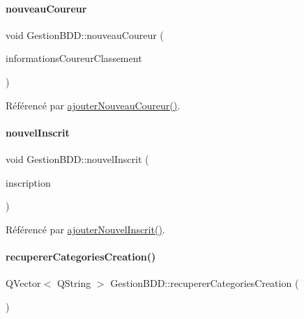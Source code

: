 \mbox{\label{class_gestion_b_d_d_acf915265e83f03b500f10ffbde2680bb}} 
\paragraph{\texorpdfstring{nouveau\+Coureur}{nouveauCoureur}}
{\footnotesize\ttfamily void Gestion\+B\+D\+D\+::nouveau\+Coureur (\begin{DoxyParamCaption}\item[{Q\+String\+List}]{informations\+Coureur\+Classement }\end{DoxyParamCaption})\hspace{0.3cm}{\ttfamily [signal]}}



Référencé par \hyperlink{class_gestion_b_d_d_ae71561eea6d1163ff067f079ccc6d169}{ajouter\+Nouveau\+Coureur()}.

\mbox{\label{class_gestion_b_d_d_a61bc349c8942a196e2edd3083465286f}} 
\paragraph{\texorpdfstring{nouvel\+Inscrit}{nouvelInscrit}}
{\footnotesize\ttfamily void Gestion\+B\+D\+D\+::nouvel\+Inscrit (\begin{DoxyParamCaption}\item[{Q\+String\+List}]{inscription }\end{DoxyParamCaption})\hspace{0.3cm}{\ttfamily [signal]}}



Référencé par \hyperlink{class_gestion_b_d_d_a71391d5419969b52cd999463b5326599}{ajouter\+Nouvel\+Inscrit()}.

\mbox{\label{class_gestion_b_d_d_a76ab3e307ad9005dcdb2781fc77fc5c8}} 
\paragraph{\texorpdfstring{recuperer\+Categories\+Creation()}{recupererCategoriesCreation()}}
{\footnotesize\ttfamily Q\+Vector$<$ Q\+String $>$ Gestion\+B\+D\+D\+::recuperer\+Categories\+Creation (\begin{DoxyParamCaption}{ }\end{DoxyParamCaption})}



